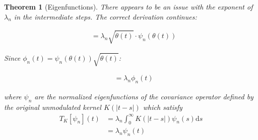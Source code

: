 \documentclass{article}
\newtheorem{theorem}{Theorem}
\newcommand{\dd}{\mathrm{d}}
\newcommand{\dottheta}{\dot{\theta}}
\begin{document}
\begin{theorem}[Eigenfunctions]
There appears to be an issue with the exponent of $\lambda_n$ in the intermediate steps. The correct derivation continues:

\begin{align}
&= \lambda_n \sqrt{\dottheta(t)} \cdot \psi_n(\theta(t))
\end{align}

Since $\phi_n(t) = \psi_n(\theta(t))\sqrt{\dottheta(t)}$:

\begin{align}
&= \lambda_n \phi_n(t)
\end{align}

where $\psi_n$ are the normalized eigenfunctions of the covariance operator defined by the original unmodulated kernel $K(|t-s|)$ which satisfy
\begin{align}
T_K[\psi_n](t) &= \lambda_n \int_0^\infty K(|t-s|)\psi_n(s) \dd s\\
&= \lambda_n \psi_n(t)
\end{align}
\end{theorem}
\end{document}
